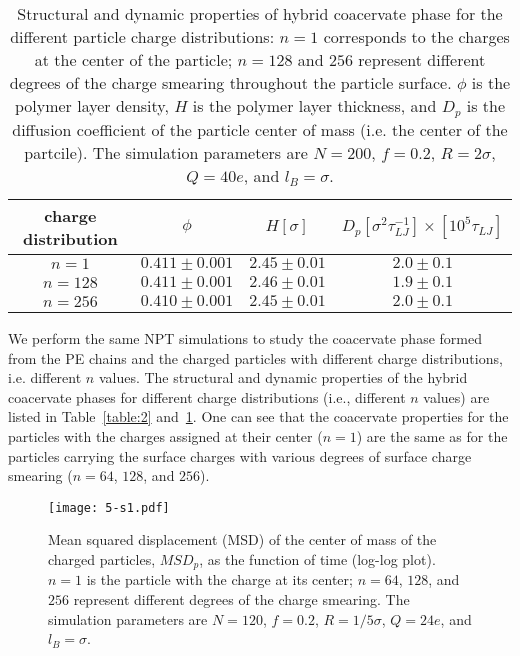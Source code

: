 \documentclass[journal=mamobx, manuscript=article]{achemso}
\begin{document}
\begin{table}[h!]
\centering
\begin{tabular}{||c c c c||} 
 \hline
 charge distribution & $\phi$ & $H [\sigma]$ & $D_{p} [\sigma^{2}\tau_{LJ}^{-1}] \times [10^{5}\tau_{LJ}]$ \\ [0.5ex]  
 \hline\hline
 $n = 1$ & $0.411 \pm 0.001$ & $2.45 \pm 0.01$ & $2.0 \pm 0.1$ \\ 
 $n = 128$ & $0.411 \pm 0.001$ & $2.46 \pm 0.01$ & $1.9 \pm 0.1$ \\
 $n = 256$ & $0.410 \pm 0.001$ & $2.45 \pm 0.01$ & $2.0 \pm 0.1$ \\[1ex] 
 \hline
\end{tabular}
\caption{Structural and dynamic properties of hybrid coacervate phase for the different particle charge distributions: $n = 1$ corresponds to the charges at the center of the particle; $n = 128$ and $256$ represent different degrees of the charge smearing throughout the particle surface. $\phi$ is the polymer layer density, $H$ is the polymer layer thickness, and $D_{p}$ is the diffusion coefficient of the particle center of mass (i.e. the center of the partcile).
The simulation parameters are $N = 200$, $f = 0.2$, $R = 2\sigma$, $Q = 40e$, and $l_{B} = \sigma$.
}
\label{table:3}
\end{table}


We perform the same NPT simulations to study the coacervate phase formed from the PE chains and the charged particles with different charge distributions, i.e. different $n$ values. The structural and dynamic properties of the hybrid coacervate phases for different charge distributions (i.e., different $n$ values) are listed in Table~\ref{table:2} and~\ref{table:3}. One can see that the coacervate properties for the particles with the charges assigned at their center ($n = 1$) are the same as for the particles carrying the surface charges with various degrees of surface charge smearing ($n = 64$, $128$, and $256$).


\begin{figure}%
\centering
\texttt{[image: 5-s1.pdf]}
\caption{Mean squared displacement (MSD) of the center of mass of the charged particles, $MSD_{p}$, as the function of time (log-log plot). $n = 1$ is the particle with the charge at its center; $n = 64$, $128$, and $256$ represent different degrees of the charge smearing. The simulation parameters are $N = 120$, $f = 0.2$, $R = 1/5\sigma$, $Q = 24e$, and $l_{B} = \sigma$.}
\label{fig:MSD-SI}
\end{figure}
\end{document}
